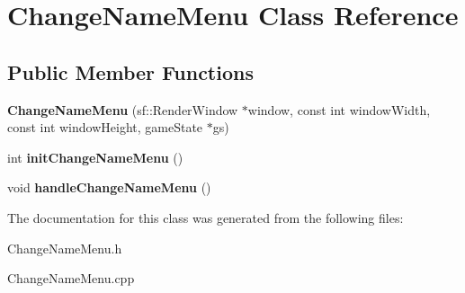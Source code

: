 \hypertarget{classChangeNameMenu}{}\section{Change\+Name\+Menu Class Reference}
\label{classChangeNameMenu}
\subsection*{Public Member Functions}
\begin{DoxyCompactItemize}
\item 
\mbox{\label{classChangeNameMenu_aee87255f196fefc48b22cd3ac8dc5dd2}} 
{\bfseries Change\+Name\+Menu} (sf\+::\+Render\+Window $\ast$window, const int window\+Width, const int window\+Height, game\+State $\ast$gs)
\item 
\mbox{\label{classChangeNameMenu_af0e30625ee17bebc5c6792732913af3f}} 
int {\bfseries init\+Change\+Name\+Menu} ()
\item 
\mbox{\label{classChangeNameMenu_a6e2b6699d594b54b1d6f0e0680cfaa16}} 
void {\bfseries handle\+Change\+Name\+Menu} ()
\end{DoxyCompactItemize}


The documentation for this class was generated from the following files\+:\begin{DoxyCompactItemize}
\item 
Change\+Name\+Menu.\+h\item 
Change\+Name\+Menu.\+cpp\end{DoxyCompactItemize}
